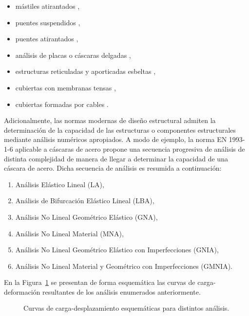 

\begin{itemize}
	\item mástiles atirantados \citep{Sparling1995},
	\item puentes suspendidos \citep{Larsen2000},
	\item puentes atirantados \citep{Wu2015,Madrazo-Aguirre2015},
	\item análisis de placas o cáscaras delgadas \citep{Hunt1998},
	\item estructuras reticuladas y aporticadas esbeltas \citep{Morozov2011},
	\item cubiertas con membranas tensas \citep{Bridgens2012},
	\item cubiertas formadas por cables \citep{Feng2013}.
\end{itemize}

Adicionalmente, las normas modernas de diseño estructural admiten la determinación de la capacidad de las estructuras o componentes estructurales mediante análisis numéricos apropiados. A modo de ejemplo, la norma EN 1993-1-6 aplicable a cáscaras de acero propone una secuencia progresiva de análisis de distinta complejidad de manera de llegar a determinar la capacidad de una cáscara de acero. Dicha secuencia de análisis es resumida a continuación:
%
\begin{enumerate}
	\item[1)]Análisis Elástico Lineal (LA),
	\item[2)]Análisis de Bifurcación Elástico Lineal (LBA),
	\item[3)]Análisis No Lineal Geométrico Elástico (GNA),
	\item[4)]Análisis No Lineal Material (MNA),
	\item[5)]Análisis No Lineal Geométrico Elástico con Imperfecciones (GNIA),
	\item[6)]Análisis No Lineal Material y Geométrico con Imperfecciones (GMNIA).
\end{enumerate}

En la Figura~\ref{fig:fig0} se presentan de forma esquemática las curvas de carga-deformación resultantes de los análisis enumerados anteriormente. %
%

\begin{figure}[htb]
	\centering
   \def\svgwidth{0.75\textwidth}
   
	\caption{Curvas de carga-desplazamiento esquemáticas para distintos análisis.}
	\label{fig:fig0}
\end{figure}

